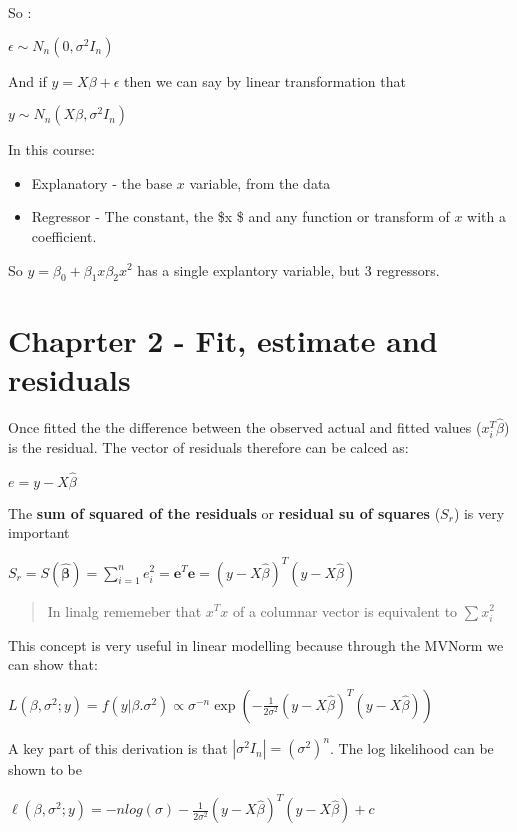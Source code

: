 \documentclass[
  letterpaper,
  DIV=11,
  numbers=noendperiod]{scrreprt}
\providecommand{\tightlist}{%
  \setlength{\itemsep}{0pt}\setlength{\parskip}{0pt}}\usepackage{longtable,booktabs,array}
\begin{document}
So :

\(\epsilon \sim N_n(0, \sigma^2 I_n)\)

And if \(y = X\beta + \epsilon\) then we can say by linear
transformation that

\(y \sim N_n(X\beta, \sigma^2 I_n)\)

In this course:

\begin{itemize}
\tightlist
\item
  Explanatory - the base \(x\) variable, from the data
\item
  Regressor - The constant, the \$\beta x \$ and any function or
  transform of \(x\) with a coefficient.
\end{itemize}

So \(y = \beta_0 + \beta_1 x \beta_2 x^2\) has a single explantory
variable, but 3 regressors.

\hypertarget{chaprter-2---fit-estimate-and-residuals}{%
\section{Chaprter 2 - Fit, estimate and
residuals}\label{chaprter-2---fit-estimate-and-residuals}}

Once fitted the the difference between the observed actual and fitted
values (\(x_i^T\hat{\beta}\)) is the residual. The vector of residuals
therefore can be calced as:

\(e = y - X\hat{\beta}\)

The \textbf{sum of squared of the residuals} or \textbf{residual su of
squares} (\(S_r\)) is very important

\(S_r = S(\hat{\boldsymbol{\beta}}) = \sum_{i=1}^n e_i^2 =\textbf{e}^T\textbf{e} = (y - X\hat{\beta})^T(y - X\hat{\beta})\)

\begin{quote}
In linalg rememeber that \(x^Tx\) of a columnar vector is equivalent to
\(\sum x^2_i\)
\end{quote}

This concept is very useful in linear modelling because through the
MVNorm we can show that:

\(L(\beta, \sigma^2 ; y) = f(y|\beta. \sigma^2) \propto \sigma^{-n}\exp(- \frac{1}{2\sigma^2}(y - X\hat{\beta})^T(y - X\hat{\beta}))\)

A key part of this derivation is that \(|\sigma^2I_n| = (\sigma^2)^n\).
The log likelihood can be shown to be

\(\ell(\beta, \sigma^2;y) = -nlog(\sigma) - \frac{1}{2\sigma^2}(y - X\hat{\beta})^T(y - X\hat{\beta}) + c\)
\end{document}
